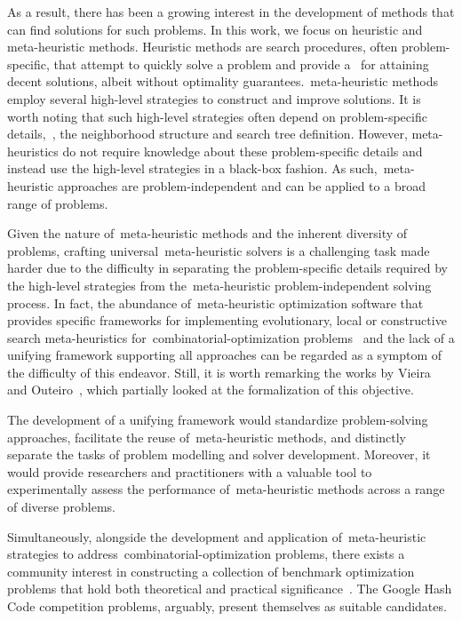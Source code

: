 As a result, there has been a growing interest in the development of methods
that can find  solutions for such problems. In this work, we
focus on heuristic and meta-heuristic methods. Heuristic methods are search
procedures, often problem-specific, that attempt to quickly solve a problem and
provide a~ for attaining decent solutions, albeit
without optimality guarantees.~\acrfull{meta-heuristic} methods employ several
high-level strategies to construct and improve solutions. It is worth noting
that such high-level strategies often depend on problem-specific details,~\eg{},
the neighborhood structure and search tree definition. However, meta-heuristics
do not require knowledge about these problem-specific details and instead use
the high-level strategies in a black-box fashion. As
such,~\acrshort{meta-heuristic} approaches are problem-independent and can be
applied to a broad range of problems.

Given the nature of~\acrshort{meta-heuristic} methods and the inherent diversity
of problems, crafting universal~\acrshort{meta-heuristic} solvers is a
challenging task made harder due to the difficulty in separating the
problem-specific details required by the high-level strategies from
the~\acrshort{meta-heuristic} problem-independent solving process. In fact, the
abundance of~\acrshort{meta-heuristic} optimization software that provides
specific frameworks for implementing evolutionary, local or constructive search
meta-heuristics for~\acrshort{combinatorial-optimization}
problems~\cite{cahon2004paradiseoa,digaspero2003easylocal,durillo2011jmetal} and
the lack of a unifying framework supporting all approaches can be regarded as a
symptom of the difficulty of this endeavor. Still, it is worth remarking the
works by Vieira~\cite{vieira2009uma} and Outeiro~\cite{outeiro2021application},
which partially looked at the formalization of this objective.

The development of a unifying framework would standardize problem-solving
approaches, facilitate the reuse of~\acrshort{meta-heuristic} methods, and
distinctly separate the tasks of problem modelling and solver development.
Moreover, it would provide researchers and practitioners with a valuable tool to
experimentally assess the performance of~\acrshort{meta-heuristic} methods
across a range of diverse problems.

Simultaneously, alongside the development and application
of~\acrshort{meta-heuristic} strategies to
address~\acrshort{combinatorial-optimization} problems, there exists a community
interest in constructing a collection of benchmark optimization problems that
hold both theoretical and practical
significance~\cite{bartz-beielstein2020benchmarking}. The Google Hash Code
competition problems, arguably, present themselves as suitable candidates.

